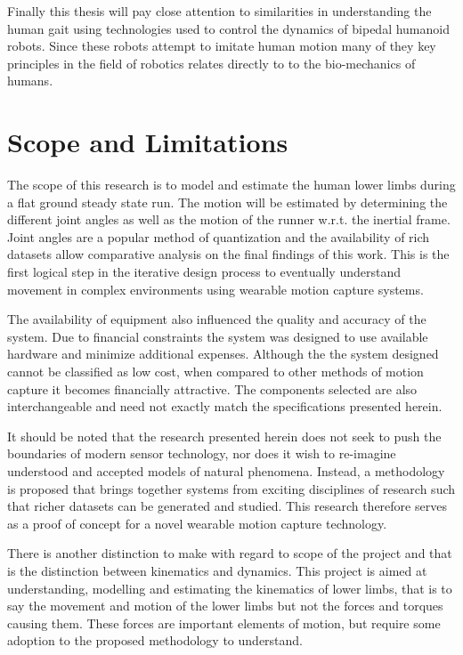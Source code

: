 Finally this thesis will pay close attention to similarities in understanding the human gait using technologies used to control the dynamics of bipedal humanoid robots. Since these robots attempt to imitate human motion many of they key principles in the field of robotics relates directly to to the bio-mechanics of humans.

\section{Scope and Limitations}
The scope of this research is to model and estimate the human lower limbs during a flat ground steady state run. The motion will be estimated by determining the different joint angles as well as the motion of the runner w.r.t. the inertial frame. Joint angles are a popular method of quantization and the availability of rich datasets allow comparative analysis on the final findings of this work. This is the first logical step in the iterative design process to eventually understand movement in complex environments using wearable motion capture systems.

The availability of equipment also influenced the quality and accuracy of the system. Due to financial constraints the system was designed to use available hardware and minimize additional expenses. Although the the system designed cannot be classified as low cost, when compared to other methods of motion capture it becomes financially attractive. The components selected are also interchangeable and need not exactly match the specifications presented herein.

It should be noted that the research presented herein does not seek to push the boundaries of modern sensor technology, nor does it wish to re-imagine understood and accepted models of natural phenomena. Instead, a methodology is proposed that brings together systems from exciting disciplines of research such that richer datasets can be generated and studied. This research therefore serves as a proof of concept for a novel wearable motion capture technology.

There is another distinction to make with regard to scope of the project and that is the distinction between kinematics and dynamics. This project is aimed at understanding, modelling and estimating the kinematics of lower limbs, that is to say the movement and motion of the lower limbs but not the forces and torques causing them. These forces are important elements of motion, but require some adoption to the proposed methodology to understand.

